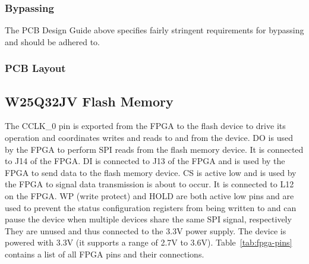\subsubsection{Bypassing}
\label{sec:xc7a15t-ftg256-bypassing}

The PCB Design Guide above specifies fairly stringent requirements for bypassing and should be
adhered to.

\subsubsection{PCB Layout}
\label{sec:xc7a15t-ftg256-pcb}



\subsection{W25Q32JV Flash Memory}
\label{sec:w25q32jv}

The CCLK\_0 pin is exported from the FPGA to the flash device to drive its operation and coordinates
writes and reads to and from the device. DO is used by the FPGA to perform SPI reads from the flash
memory device. It is connected to J14 of the FPGA\@. DI is connected to J13 of the FPGA and is used
by the FPGA to send data to the flash memory device. CS is active low and is used by the FPGA to
signal data transmission is about to occur. It is connected to L12 on the FPGA\@. WP (write protect)
and HOLD are both active low pins and are used to prevent the status configuration registers from
being written to and can pause the device when multiple devices share the same SPI signal,
respectively They are unused and thus connected to the 3.3V power supply. The device is powered with
3.3V (it supports a range of 2.7V to 3.6V). Table~\ref{tab:fpga-pins} contains a list of all FPGA
pins and their connections.

